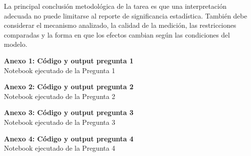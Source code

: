 \documentclass[12pt,letterpaper]{article}
\begin{document}
La principal conclusión metodológica de la tarea es que una interpretación adecuada no puede limitarse al reporte de significancia estadística. También debe considerar el mecanismo analizado, la calidad de la medición, las restricciones comparadas y la forma en que los efectos cambian según las condiciones del modelo.


\newpage
{}
\begin{center}
\vspace*{0.35\textheight}
{\Large \textbf{Anexo 1: Código y output pregunta 1}}\\[1em]
{\large Notebook ejecutado de la Pregunta 1}
\end{center}
\newpage


\newpage
{}
\begin{center}
\vspace*{0.35\textheight}
{\Large \textbf{Anexo 2: Código y output pregunta 2}}\\[1em]
{\large Notebook ejecutado de la Pregunta 2}
\end{center}
\newpage


\newpage
{}
\begin{center}
\vspace*{0.35\textheight}
{\Large \textbf{Anexo 3: Código y output pregunta 3}}\\[1em]
{\large Notebook ejecutado de la Pregunta 3}
\end{center}
\newpage


\newpage
{}
\begin{center}
\vspace*{0.35\textheight}
{\Large \textbf{Anexo 4: Código y output pregunta 4}}\\[1em]
{\large Notebook ejecutado de la Pregunta 4}
\end{center}
\newpage

\end{document}
